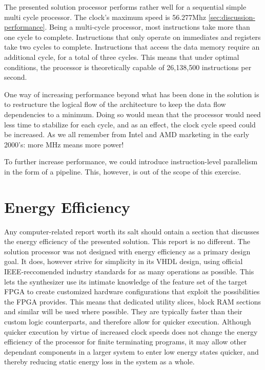 The presented solution processor performs rather well for a sequential simple multi cycle processor.
The clock's maximum speed is 56.277Mhz \vref{sec:discussion-performance}.
Being a multi-cycle processor, most instructions take more than one cycle to complete.
Instructions that only operate on immediates and registers take two cycles to complete.
Instructions that access the data memory require an additional cycle, for a total of three cycles.
This means that under optimal conditions, the processor is theoretically capable of 26,138,500 instructions per second.

One way of increasing performance beyond what has been done in the solution is to restructure the logical flow of the architecture to keep the data flow dependencies to a minimum.
Doing so would mean that the processor would need less time to stabilize for each cycle, and as an effect, the clock cycle speed could be increased.
As we all remember from Intel and AMD marketing in the early 2000's: more MHz means more power!

To further increase performance, we could introduce instruction-level parallelism in the form of a pipeline.
This, however, is out of the scope of this exercise.

\section{Energy Efficiency}

Any computer-related report worth its salt should ontain a section that discusses the energy efficiency of the presented solution.
This report is no different.
The solution processor was not designed with energy efficiency as a primary design goal.
It does, however strive for simplicity in its VHDL design, using official IEEE-reccomended industry standards for as many operations as possible.
This lets the synthesizer use its intimate knowledge of the feature set of the target FPGA to create customized hardware configurations that exploit the possibilities the FPGA provides.
This means that dedicated utility slices, block RAM sections and similar will be used where possible.
They are typically faster than their custom logic counterparts, and therefore allow for quicker execution.
Although quicker execution by virtue of increased clock speeds does not change the energy efficiency of the processor for finite terminating programs, it may allow other dependant components in a larger system to enter low energy states quicker, and thereby reducing static energy loss in the system as a whole.

